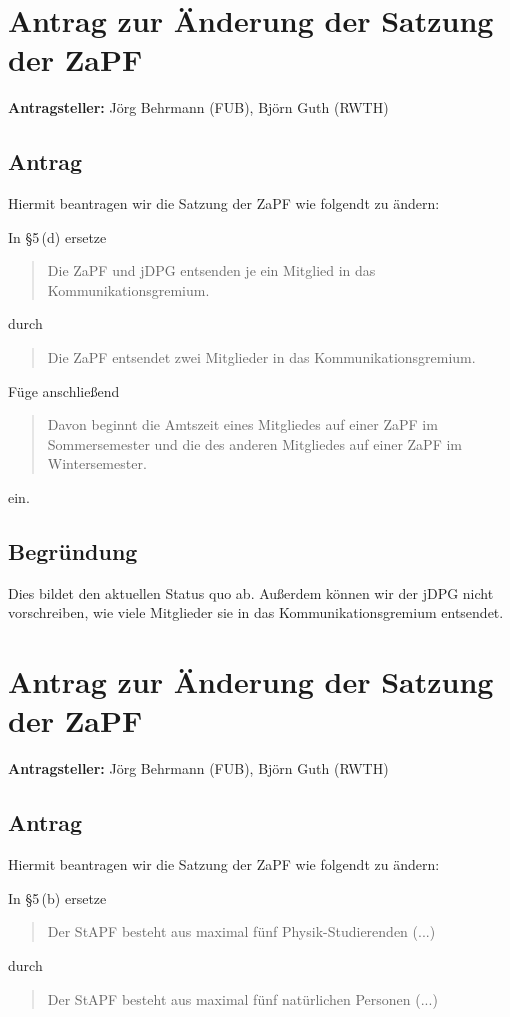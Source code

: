 \documentclass[draft,10pt,oneside]{scrartcl}
\begin{document}
\section*{Antrag zur Änderung der Satzung der ZaPF}

\textbf{Antragsteller:} Jörg Behrmann (FUB), Björn Guth (RWTH)

\subsection*{Antrag}

Hiermit beantragen wir die Satzung der ZaPF wie folgendt zu ändern:

In §5\,(d) ersetze
\begin{quote}
	Die ZaPF und jDPG entsenden je ein Mitglied in das Kommunikationsgremium.
\end{quote}
durch
\begin{quote}
	Die ZaPF entsendet zwei Mitglieder in das Kommunikationsgremium.
\end{quote}

Füge anschließend
\begin{quote}
	Davon beginnt die Amtszeit eines Mitgliedes auf einer ZaPF im Sommersemester und
	die des anderen Mitgliedes auf einer ZaPF im Wintersemester.
\end{quote}
ein.

\subsection*{Begründung}
Dies bildet den aktuellen Status quo ab. Außerdem können wir der jDPG nicht
vorschreiben, wie viele Mitglieder sie in das Kommunikationsgremium entsendet.

\newpage

\section*{Antrag zur Änderung der Satzung der ZaPF}

\textbf{Antragsteller:} Jörg Behrmann (FUB), Björn Guth (RWTH)

\subsection*{Antrag}

Hiermit beantragen wir die Satzung der ZaPF wie folgendt zu ändern:

In §5\,(b) ersetze
\begin{quote}
	Der StAPF besteht aus maximal fünf Physik-Studierenden (...)
\end{quote}
durch
\begin{quote}
	Der StAPF besteht aus maximal fünf natürlichen Personen (...)
\end{quote}
\end{document}
